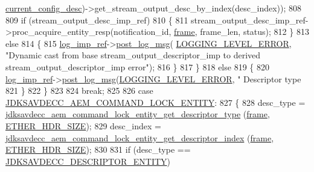 \begin{DoxyCode}
      \hyperlink{classavdecc__lib_1_1end__station__imp_a60b1af40d35e8a86b0082c54ab6cb6a8}{current\_config\_desc})->get\_stream\_output\_desc\_by\_index(desc\_index));
808 
809             \textcolor{keywordflow}{if} (stream\_output\_desc\_imp\_ref)
810             \{
811                 stream\_output\_desc\_imp\_ref->proc\_acquire\_entity\_resp(notification\_id, 
      \hyperlink{gst__avb__playbin_8c_ac8e710e0b5e994c0545d75d69868c6f0}{frame}, frame\_len, status);
812             \}
813             \textcolor{keywordflow}{else}
814             \{
815                 \hyperlink{namespaceavdecc__lib_acbe3e2a96ae6524943ca532c87a28529}{log\_imp\_ref}->\hyperlink{classavdecc__lib_1_1log_a68139a6297697e4ccebf36ccfd02e44a}{post\_log\_msg}(
      \hyperlink{namespaceavdecc__lib_a501055c431e6872ef46f252ad13f85cdaf2c4481208273451a6f5c7bb9770ec8a}{LOGGING\_LEVEL\_ERROR}, \textcolor{stringliteral}{"Dynamic cast from base stream\_output\_descriptor\_imp to derived
       stream\_output\_descriptor\_imp error"});
816             \}
817         \}
818         \textcolor{keywordflow}{else}
819         \{
820             \hyperlink{namespaceavdecc__lib_acbe3e2a96ae6524943ca532c87a28529}{log\_imp\_ref}->\hyperlink{classavdecc__lib_1_1log_a68139a6297697e4ccebf36ccfd02e44a}{post\_log\_msg}(\hyperlink{namespaceavdecc__lib_a501055c431e6872ef46f252ad13f85cdaf2c4481208273451a6f5c7bb9770ec8a}{LOGGING\_LEVEL\_ERROR}, \textcolor{stringliteral}{"
      Descriptor type %
821         \}
822     \}
823 
824     \textcolor{keywordflow}{break};
825 
826     \textcolor{keywordflow}{case} \hyperlink{group__command_ga96be22db90d10cec463db06ab42751c4}{JDKSAVDECC\_AEM\_COMMAND\_LOCK\_ENTITY}:
827     \{
828         desc\_type = \hyperlink{group__command__lock__entity_ga4e90852d171513d0347947869b00d7c5}{jdksavdecc\_aem\_command\_lock\_entity\_get\_descriptor\_type}
      (\hyperlink{gst__avb__playbin_8c_ac8e710e0b5e994c0545d75d69868c6f0}{frame}, \hyperlink{namespaceavdecc__lib_a6c827b1a0d973e18119c5e3da518e65ca9512ad9b34302ba7048d88197e0a2dc0}{ETHER\_HDR\_SIZE});
829         desc\_index = \hyperlink{group__command__lock__entity_gabfe9a5d0582adea94a9b28e47c7e2358}{jdksavdecc\_aem\_command\_lock\_entity\_get\_descriptor\_index}
      (\hyperlink{gst__avb__playbin_8c_ac8e710e0b5e994c0545d75d69868c6f0}{frame}, \hyperlink{namespaceavdecc__lib_a6c827b1a0d973e18119c5e3da518e65ca9512ad9b34302ba7048d88197e0a2dc0}{ETHER\_HDR\_SIZE});
830 
831         \textcolor{keywordflow}{if} (desc\_type == \hyperlink{group__descriptor_gaf06b7a0bf808dc8e3104511947d694c4}{JDKSAVDECC\_DESCRIPTOR\_ENTITY})
}
\end{DoxyCode}

